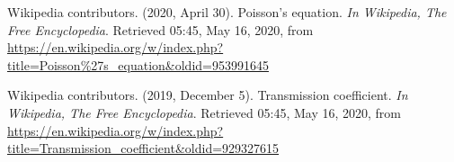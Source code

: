 \documentclass[12pt]{article}
\begin{document}
\begin{thebibliography}{}

 Wikipedia contributors. (2020, April 30). Poisson's equation. {\it In Wikipedia, The Free Encyclopedia}. Retrieved 05:45, May 16, 2020, from \url{https://en.wikipedia.org/w/index.php?title=Poisson%27s_equation&oldid=953991645}

 Wikipedia contributors. (2019, December 5). Transmission coefficient. {\it In Wikipedia, The Free Encyclopedia}. Retrieved 05:45, May 16, 2020, from \url{https://en.wikipedia.org/w/index.php?title=Transmission_coefficient&oldid=929327615}
 
\end{thebibliography}
\end{document}
